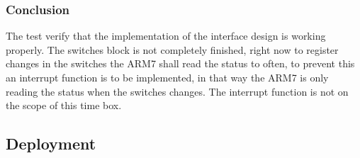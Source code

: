 \subsubsection{Conclusion}
The test verify that the implementation of the interface design is working properly. The switches block is not completely finished, right now to register changes in the switches the ARM7 shall read the status to often, to prevent this an interrupt function is to be implemented, in that way the ARM7 is only reading the status when the switches changes. The interrupt function is not on the scope of this time box.
\subsection{Deployment}
